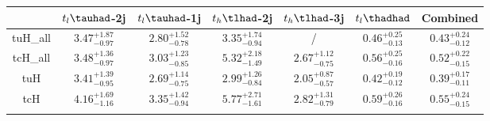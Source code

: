 
\centering
\begin{tabular}{ccccccc} \toprule\toprule
 & $t_l\tauhad$-2j & $t_l\tauhad$-1j & $t_h\tlhad$-2j  & $t_h\tlhad$-3j & $t_l\thadhad$ & Combined \\\midrule
tuH\_all & $3.47^{+1.87}_{-0.97}$ & $2.80^{+1.52}_{-0.78}$ & $3.35^{+1.74}_{-0.94}$ &  / &$0.46^{+0.25}_{-0.13}$& $0.43^{+0.24}_{-0.12}$\\
tcH\_all & $3.48^{+1.36}_{-0.97}$ & $3.03^{+1.23}_{-0.85}$ & $5.32^{+2.18}_{-1.49}$ & $2.67^{+1.12}_{-0.75}$ & $0.56^{+0.25}_{-0.16}$ &  $0.52^{+0.22}_{-0.15}$\\
tuH & $3.41^{+1.39}_{-0.95}$ & $2.69^{+1.14}_{-0.75}$ & $2.99^{+1.26}_{-0.84}$ & $2.05^{+0.87}_{-0.57}$ & $0.42^{+0.19}_{-0.12}$ & $0.39^{+0.17}_{-0.11}$\\
tcH & $4.16^{+1.69}_{-1.16}$ & $3.35^{+1.42}_{-0.94}$ & $5.77^{+2.71}_{-1.61}$ & $2.82^{+1.31}_{-0.79}$ & $0.59^{+0.26}_{-0.16}$ & $0.55^{+0.24}_{-0.15}$\\
\bottomrule\bottomrule\\
\end{tabular}
